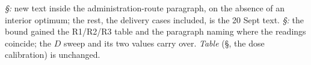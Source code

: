 \W \emph{\S{}:} new text inside the administration-route paragraph, on the
absence of an interior optimum; the rest, the delivery cases included, is the 20 Sept text. \emph{\S{}:}
the bound gained the R1/R2/R3 table and the paragraph naming where the readings coincide; the
$D$ sweep and its two values carry over. \emph{Table }
(\S{}, the dose calibration) is unchanged.


